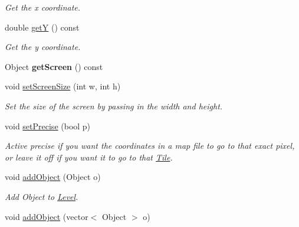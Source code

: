 \begin{DoxyCompactItemize}
\begin{DoxyCompactList}\small\item\em Get the x coordinate. \end{DoxyCompactList}\item 
double \hyperlink{classLevel_acb5b4e5e0bf364142fa0facc7badea4a}{getY} () const \hypertarget{classLevel_acb5b4e5e0bf364142fa0facc7badea4a}{}\label{classLevel_acb5b4e5e0bf364142fa0facc7badea4a}

\begin{DoxyCompactList}\small\item\em Get the y coordinate. \end{DoxyCompactList}\item 
Object {\bfseries get\+Screen} () const \hypertarget{classLevel_afb6205bfc9804c5ec5561696341b6dc7}{}\label{classLevel_afb6205bfc9804c5ec5561696341b6dc7}

\item 
void \hyperlink{classLevel_a22a202624bb540acc74b678b74b60c9d}{set\+Screen\+Size} (int w, int h)\hypertarget{classLevel_a22a202624bb540acc74b678b74b60c9d}{}\label{classLevel_a22a202624bb540acc74b678b74b60c9d}

\begin{DoxyCompactList}\small\item\em Set the size of the screen by passing in the width and height. \end{DoxyCompactList}\item 
void \hyperlink{classLevel_a6f522671fde4a9d25945a9df651f6e28}{set\+Precise} (bool p)\hypertarget{classLevel_a6f522671fde4a9d25945a9df651f6e28}{}\label{classLevel_a6f522671fde4a9d25945a9df651f6e28}

\begin{DoxyCompactList}\small\item\em Active precise if you want the coordinates in a map file to go to that exact pixel, or leave it off if you want it to go to that \hyperlink{classTile}{Tile}. \end{DoxyCompactList}\item 
void \hyperlink{classLevel_a85e4149562c645b6ee11e7a0338dc6d6}{add\+Object} (Object o)\hypertarget{classLevel_a85e4149562c645b6ee11e7a0338dc6d6}{}\label{classLevel_a85e4149562c645b6ee11e7a0338dc6d6}

\begin{DoxyCompactList}\small\item\em Add Object to \hyperlink{classLevel}{Level}. \end{DoxyCompactList}\item 
void \hyperlink{classLevel_a227e7b01aecb4cfd14cd54233788dee2}{add\+Object} (vector$<$ Object $>$ o)\hypertarget{classLevel_a227e7b01aecb4cfd14cd54233788dee2}{}\label{classLevel_a227e7b01aecb4cfd14cd54233788dee2}


\end{DoxyCompactItemize}
